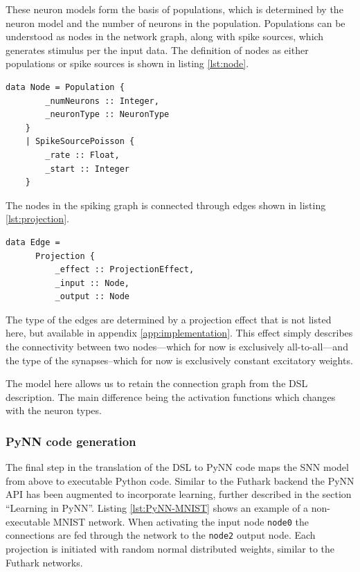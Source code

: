 These neuron models form the basis of populations, which is determined by the
neuron model and the number of neurons in the population.
Populations can be understood as nodes in the network graph, along with
spike sources, which generates stimulus per the input data.
The definition of nodes as either populations or spike sources is shown in
listing \ref{lst:node}.

\lstset{language=,caption=The definition of a node as either a population or a
spike source.,label=lst:node}
\begin{lstlisting}
data Node = Population {
        _numNeurons :: Integer,
        _neuronType :: NeuronType
    }
    | SpikeSourcePoisson {
        _rate :: Float,
        _start :: Integer
    }
\end{lstlisting}

The nodes in the spiking graph is connected through edges shown in 
listing \ref{lst:projection}.

\lstset{language=,caption=The definition of an edge as a projection between
two nodes with a certain effect.,label=lst:projection}
\begin{lstlisting}
data Edge =
      Projection {
          _effect :: ProjectionEffect,
          _input :: Node,
          _output :: Node
\end{lstlisting}

The type of the edges are determined by a projection effect that is
not listed here, but available in appendix \ref{app:implementation}.
This effect simply describes the connectivity between two nodes---which
for now is exclusively all-to-all---and the type of the synapses--which
for now is exclusively constant excitatory weights.

The model here allows us to retain the connection graph from the \gls{DSL}
description.
The main difference being the activation functions which changes with the
neuron types.

\subsubsection{PyNN code generation}
The final step in the translation of the \gls{DSL} to PyNN code maps the
\gls{SNN} model from above to executable Python code.
Similar to the Futhark backend the PyNN API has been augmented to 
incorporate learning, further described in the section ``Learning in PyNN''.
Listing \ref{lst:PyNN-MNIST} shows an example of a non-executable MNIST network.
When activating the input node \texttt{node0} the connections are fed through
the network to the \texttt{node2} output node.
Each projection is initiated with random normal distributed weights, similar
to the Futhark networks.

